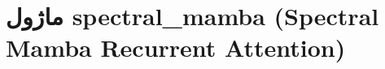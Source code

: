 \section{ماژول spectral\_mamba (Spectral Mamba Recurrent Attention)}
\label{sec:module_spectral_mamba}
